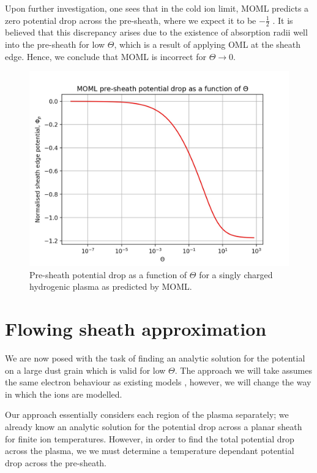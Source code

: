 \documentclass{article}
\begin{document}
Upon further investigation, one sees that in the cold ion limit, MOML
predicts a zero potential drop across the pre-sheath, where we expect it to be $-\frac{1}{2}$ \cite{Stangeby1986}.
It is believed that this discrepancy arises due to the existence of absorption radii well into
the pre-sheath for low $\Theta$, which is a result of applying OML at the sheath edge. 
Hence, we conclude that MOML is incorrect for $\Theta \to 0$.

\begin{figure}[H]
\centering
\includegraphics[width=\linewidth]{Output/MOMLpresheath.jpeg}
\caption{Pre-sheath potential drop as a function of $\Theta$ for a singly charged hydrogenic plasma as predicted
by MOML.}
\label{MOMLpresheath} 
\end{figure}

\section{Flowing sheath approximation}

We are now posed with the task of finding an analytic solution for the
potential on a large dust grain which is valid for low $\Theta$. The approach we will
take assumes the same electron behaviour as existing models \cite{Willis}, however, we will
change the way in which the ions are modelled.

\smallskip

Our approach essentially considers each region of the plasma separately; we
already know an analytic solution for the potential drop across a planar sheath
for finite ion temperatures. However, in order to find the total potential drop across the plasma, we 
we must determine a temperature dependant potential drop across the pre-sheath.
\end{document}
